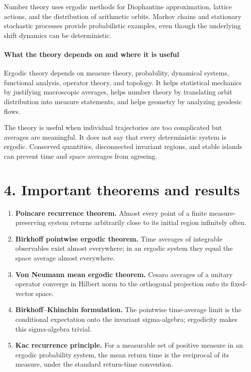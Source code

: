 Number theory uses ergodic methods for Diophantine approximation, lattice actions, and the distribution of arithmetic orbits. Markov chains and stationary stochastic processes provide probabilistic examples, even though the underlying shift dynamics can be deterministic.

\paragraph{What the theory depends on and where it is useful}

Ergodic theory depends on measure theory, probability, dynamical systems, functional analysis, operator theory, and topology. It helps statistical mechanics by justifying macroscopic averages, helps number theory by translating orbit distribution into measure statements, and helps geometry by analyzing geodesic flows.

The theory is useful when individual trajectories are too complicated but averages are meaningful. It does not say that every deterministic system is ergodic. Conserved quantities, disconnected invariant regions, and stable islands can prevent time and space averages from agreeing.

\section*{4. Important theorems and results}
\begin{enumerate}[leftmargin=*,itemsep=0.35em]

\item \textbf{Poincare recurrence theorem.} Almost every point of a finite measure-preserving system returns arbitrarily close to its initial region infinitely often. \cite{ergodic_theory_ref1}

\item \textbf{Birkhoff pointwise ergodic theorem.} Time averages of integrable observables exist almost everywhere; in an ergodic system they equal the space average almost everywhere. \cite{ergodic_theory_ref1}

\item \textbf{Von Neumann mean ergodic theorem.} Cesaro averages of a unitary operator converge in Hilbert norm to the orthogonal projection onto its fixed-vector space. \cite{ergodic_theory_ref5}

\item \textbf{Birkhoff--Khinchin formulation.} The pointwise time-average limit is the conditional expectation onto the invariant sigma-algebra; ergodicity makes this sigma-algebra trivial. \cite{ergodic_theory_ref2}

\item \textbf{Kac recurrence principle.} For a measurable set of positive measure in an ergodic probability system, the mean return time is the reciprocal of its measure, under the standard return-time convention. \cite{ergodic_theory_ref4}
\end{enumerate}

